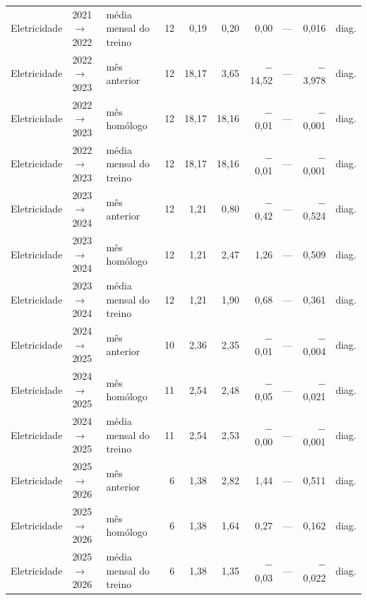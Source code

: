{\begin{xltabular}{\linewidth}{@{}llp{2.4cm}rrrrlrl@{}}
Eletricidade & 2021$\to$2022 & média mensal do treino & 12 & 0,19 & 0,20 & 0,00 & --- & 0,016 & diag. \\
Eletricidade & 2022$\to$2023 & mês anterior & 12 & 18,17 & 3,65 & $-$14,52 & --- & $-$3,978 & diag. \\
Eletricidade & 2022$\to$2023 & mês homólogo & 12 & 18,17 & 18,16 & $-$0,01 & --- & $-$0,001 & diag. \\
Eletricidade & 2022$\to$2023 & média mensal do treino & 12 & 18,17 & 18,16 & $-$0,01 & --- & $-$0,001 & diag. \\
Eletricidade & 2023$\to$2024 & mês anterior & 12 & 1,21 & 0,80 & $-$0,42 & --- & $-$0,524 & diag. \\
Eletricidade & 2023$\to$2024 & mês homólogo & 12 & 1,21 & 2,47 & 1,26 & --- & 0,509 & diag. \\
Eletricidade & 2023$\to$2024 & média mensal do treino & 12 & 1,21 & 1,90 & 0,68 & --- & 0,361 & diag. \\
Eletricidade & 2024$\to$2025 & mês anterior & 10 & 2,36 & 2,35 & $-$0,01 & --- & $-$0,004 & diag. \\
Eletricidade & 2024$\to$2025 & mês homólogo & 11 & 2,54 & 2,48 & $-$0,05 & --- & $-$0,021 & diag. \\
Eletricidade & 2024$\to$2025 & média mensal do treino & 11 & 2,54 & 2,53 & $-$0,00 & --- & $-$0,001 & diag. \\
Eletricidade & 2025$\to$2026 & mês anterior & 6 & 1,38 & 2,82 & 1,44 & --- & 0,511 & diag. \\
Eletricidade & 2025$\to$2026 & mês homólogo & 6 & 1,38 & 1,64 & 0,27 & --- & 0,162 & diag. \\
Eletricidade & 2025$\to$2026 & média mensal do treino & 6 & 1,38 & 1,35 & $-$0,03 & --- & $-$0,022 & diag. \\
\end{xltabular}
}
